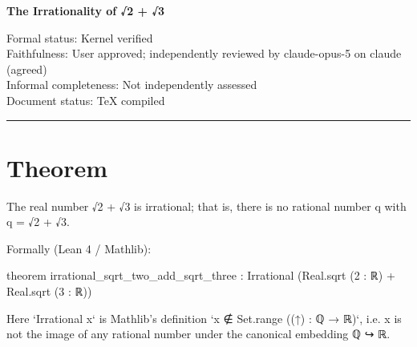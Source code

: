 \documentclass[11pt]{article}
\begin{document}
\begin{center}
{\LARGE\color{HardyBlue}\bfseries The Irrationality of √2 + √3\par}
\vspace{1em}
Formal status: Kernel verified\\
Faithfulness: User approved; independently reviewed by claude-opus-5 on claude (agreed)\\
Informal completeness: Not independently assessed\\
Document status: TeX compiled
\end{center}

\hrule
\vspace{1em}

\section*{Theorem}
The real number √2 + √3 is irrational; that is, there is no rational number q with q = √2 + √3.

Formally (Lean 4 / Mathlib):

    theorem irrational\_sqrt\_two\_add\_sqrt\_three :
        Irrational (Real.sqrt (2 : ℝ) + Real.sqrt (3 : ℝ))

Here `Irrational x` is Mathlib's definition `x ∉ Set.range ((↑) : ℚ → ℝ)`, i.e. x is not the image of any rational number under the canonical embedding ℚ ↪ ℝ.
\end{document}
